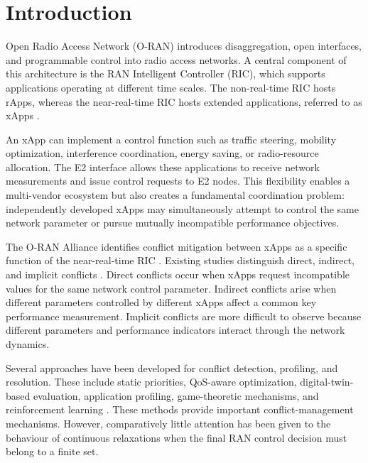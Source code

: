 \documentclass[pdflatex,sn-mathphys-num,iicol,oneside]{sn-jnl}
\begin{document}
\section{Introduction}

Open Radio Access Network (O-RAN) introduces disaggregation,
open interfaces, and programmable control into radio access
networks. A central component of this architecture is the RAN
Intelligent Controller (RIC), which supports applications operating
at different time scales. The non-real-time RIC hosts rApps, whereas
the near-real-time RIC hosts extended applications, referred to as
xApps \cite{polese2023oran}.

An xApp can implement a control function such as traffic steering,
mobility optimization, interference coordination, energy saving, or
radio-resource allocation. The E2 interface allows these applications
to receive network measurements and issue control requests to E2
nodes. This flexibility enables a multi-vendor ecosystem but also
creates a fundamental coordination problem: independently developed
xApps may simultaneously attempt to control the same network
parameter or pursue mutually incompatible performance objectives.

The O-RAN Alliance identifies conflict mitigation between xApps as a
specific function of the near-real-time RIC
\cite{oran2024conflict}. Existing studies distinguish direct,
indirect, and implicit conflicts
\cite{adamczyk2023conflict,wadud2024qacm}.
Direct conflicts occur when xApps request incompatible values for the
same network control parameter. Indirect conflicts arise when
different parameters controlled by different xApps affect a common
key performance measurement. Implicit conflicts are more difficult
to observe because different parameters and performance indicators
interact through the network dynamics.

Several approaches have been developed for conflict detection,
profiling, and resolution. These include static priorities,
QoS-aware optimization, digital-twin-based evaluation, application
profiling, game-theoretic mechanisms, and reinforcement learning
\cite{wadud2024qacm,prever2025pacifista,
giannopoulos2025comix,wadud2025mobility}.
These methods provide important conflict-management mechanisms.
However, comparatively little attention has been given to the
behaviour of continuous relaxations when the final RAN control
decision must belong to a finite set.
\end{document}
